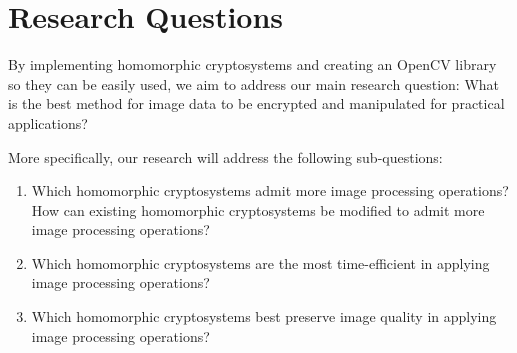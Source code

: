 \section{Research Questions}

By implementing homomorphic cryptosystems and creating an OpenCV library so they can be easily used, we aim to address our main research question: What is the best method for image data to be encrypted and manipulated for practical applications?

More specifically, our research will address the following sub-questions:
\begin{enumerate}
	\item Which homomorphic cryptosystems admit more image processing operations? How can existing homomorphic cryptosystems be modified to admit more image processing operations?
	\item Which homomorphic cryptosystems are the most time-efficient in applying image processing operations?
	\item Which homomorphic cryptosystems best preserve image quality in applying image processing operations?
\end{enumerate}
